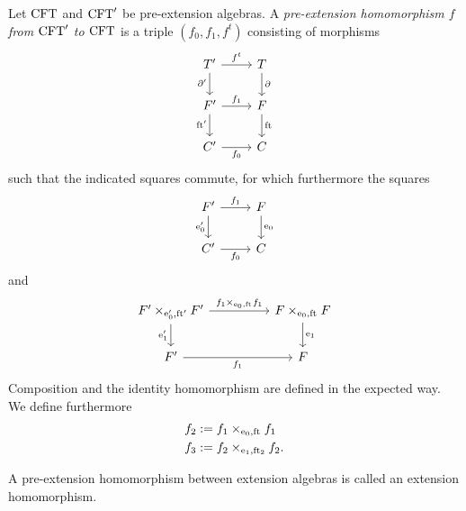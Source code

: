 \begin{defn}
Let $\mathrm{CFT}$ and $\mathrm{CFT}'$ be pre-extension algebras. A \emph{pre-extension 
homomorphism $f$ from $\mathrm{CFT}'$ to $\mathrm{CFT}$} is a triple $(f_0,f_1,f^t)$ 
consisting of morphisms
\begin{equation*}
\begin{tikzcd}
\stesyst' 
  \ar{r}{f^t}
  \ar{d}[swap]{\ebd'}
  &
\stesyst
  \ar{d}{\ebd}
  \\
\stesysf'
  \ar{r}{f_1}
  \ar{d}[swap]{\eft'}
  &
\stesysf
  \ar{d}{\eft}
  \\
\stesysc' 
  \ar{r}[swap]{f_0}
  &
\stesysc
\end{tikzcd}
\end{equation*}
such that the indicated squares commute, for which furthermore the squares
\begin{equation*}
\begin{tikzcd}
\stesysf' 
  \ar{r}{f_1}
  \ar{d}[swap]{\ectxext'}
  &
\stesysf
  \ar{d}{\ectxext}
  \\
\stesysc'
  \ar{r}[swap]{f_0}
  &
\stesysc
\end{tikzcd}
\end{equation*}
and
\begin{equation*}
\begin{tikzcd}[column sep=huge]
\stesysf'\times_{\ectxext',\eft'} \stesysf'
  \ar{r}{f_1\times_{\ectxext,\eft} f_1}
  \ar{d}[swap]{\efamext'}
  &
\stesysf\times_{\ectxext,\eft} \stesysf
  \ar{d}{\efamext}
  \\
\stesysf'
  \ar{r}[swap]{f_1}
  &
\stesysf
\end{tikzcd}
\end{equation*}
Composition and the identity homomorphism are defined in the expected way. We
define furthermore
\begin{align*}
f_2 & := \pullback{f_1}{f_1}{\ectxext}{\eft}
  \\
f_3 & := \pullback{f_2}{f_2}{\efamext}{\eft[2]}.
\end{align*}
\end{defn}

\begin{defn}
A pre-extension homomorphism between extension algebras is called an extension
homomorphism.
\end{defn}

